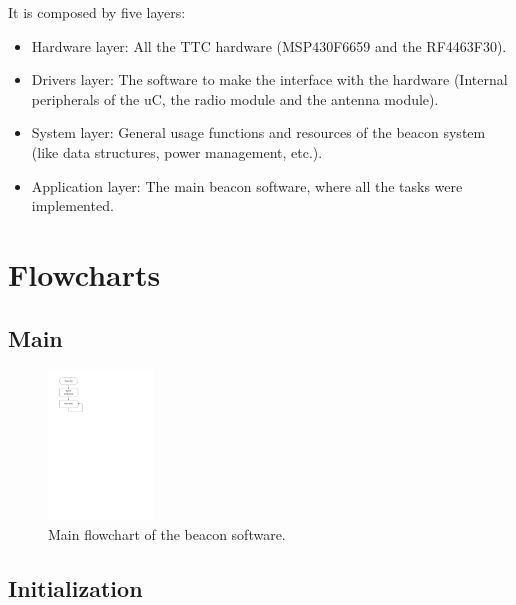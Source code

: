 \documentclass[12pt]{book}
\begin{document}
It is composed by five layers:

\begin{itemize}
    \item Hardware layer: All the TTC hardware (MSP430F6659 and the RF4463F30).
    \item Drivers layer: The software to make the interface with the hardware (Internal peripherals of the uC, the radio module and the antenna module).
    \item System layer: General usage functions and resources of the beacon system (like data structures, power management, etc.).
    \item Application layer: The main beacon software, where all the tasks were implemented.
\end{itemize}

\section{Flowcharts}

\subsection{Main}

\begin{figure}[!h]
	\begin{center}
		\includegraphics[width=0.25\textwidth]{figures/beacon_main_flowchart.pdf}
		\caption{Main flowchart of the beacon software.}
		\label{fig:beacon-main-flowchart}
	\end{center}
\end{figure}

\subsection{Initialization}
\end{document}
